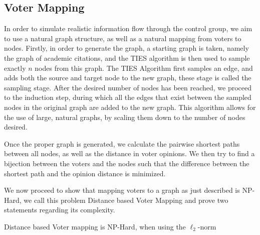 \subsection{Voter Mapping}
In order to simulate realistic information flow through the control group, we aim to use a natural graph structure, as well as a natural mapping from voters to nodes. Firstly, in order to generate the graph, a starting graph is taken, namely the graph of academic citations, and the TIES \cite{ahmedNetworkSamplingStatic2013} algorithm is then used to sample exactly $n$ nodes from this graph. The TIES Algorithm first samples an edge, and adds both the source and target node to the new graph, these stage is called the sampling stage. After the desired number of nodes has been reached, we proceed to the induction step, during which all the edges that exist between the sampled nodes in the original graph are added to the new graph. This algorithm allows for the use of large, natural graphs, by scaling them down to the number of nodes desired.

Once the proper graph is generated, we calculate the pairwise shortest paths between all nodes, as well as the distance in voter opinions. We then try to find a bijection between the voters and the nodes such that the difference between the shortest path and the opinion distance is minimized.

We now proceed to show that mapping voters to a graph as just described is NP-Hard, we call this problem Distance based Voter Mapping and prove two statements regarding its complexity.

\begin{theorem}
	Distance based Voter mapping is NP-Hard, when using the $\ell_2$-norm
	\label{thm:np_hard_voter_mapping_l2}
\end{theorem}


